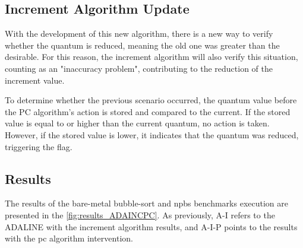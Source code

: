 \subsection{Increment Algorithm Update}

With the development of this new algorithm, there is a new way to verify whether the quantum is reduced, meaning the old one was greater 
than the desirable. For this reason, the increment algorithm will also verify this situation, counting as an "inaccuracy problem", contributing 
to the reduction of the increment value.

To determine whether the previous scenario occurred, the quantum value before the PC algorithm's action is stored and compared to the current. 
If the stored value is equal to or higher than the current quantum, no action is taken. However, if the stored value is lower, it indicates that 
the quantum was reduced, triggering the flag. 


\subsection{Results}

The results of the bare-metal bubble-sort and \glspl{npb} benchmarks execution are presented in the \autoref{fig:results_ADAINCPC}. As previously, 
A-I refers to the ADALINE with the increment algorithm results, and A-I-P points to the results with the \gls{pc} algorithm intervention. 

